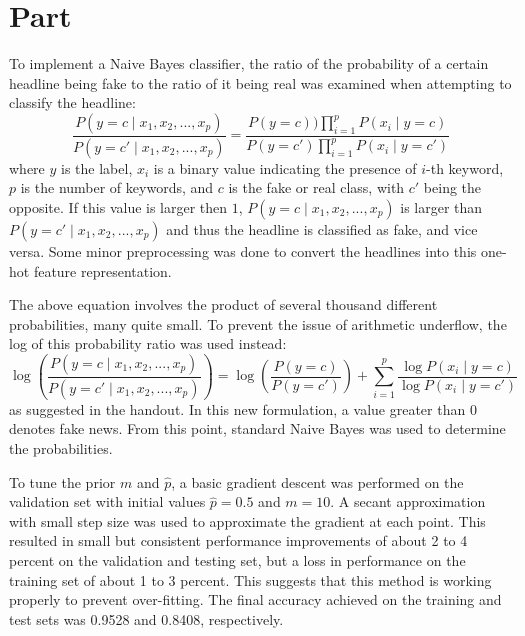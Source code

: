 \documentclass{article}
\newcommand{\enterproblemHeader}[1]{
}
\newcommand{\exitproblemHeader}[1]{
}
\newcounter{problem} %
\newcommand{\problemName}{}
\newenvironment{problem}[1][Part \theproblem]{ %
	\stepcounter{problem} %
	\renewcommand{\problemName}{#1} %
	\section{\problemName} %
	\enterproblemHeader{\problemName} %
}{
	\exitproblemHeader{\problemName} %
}
\begin{document}
\begin{problem}
	
	To implement a Naive Bayes classifier, the ratio of the probability of a certain headline being fake to the ratio of it being real was examined when attempting to classify the headline:
	\begin{equation*}
		\frac{P(y = c \mid x_1, x_2, ..., x_p)}{P(y = c' \mid x_1, x_2, ..., x_p)} = \frac{P(y = c))\prod_{i=1}^{p}P(x_i \mid y = c)}{P(y = c')\prod_{i=1}^{p}P(x_i \mid y = c')}
	\end{equation*}
	where \(y\) is the label, \(x_i\) is a binary value indicating the presence of \(i\)-th keyword, \(p\) is the number of keywords, and \(c\) is the fake or real class, with \(c'\) being the opposite. If this value is larger then \(1\), \(P(y = c \mid x_1, x_2, ..., x_p)\) is larger than \(P(y = c' \mid x_1, x_2, ..., x_p)\) and thus the headline is classified as fake, and vice versa. Some minor preprocessing was done to convert the headlines into this one-hot feature representation.
	
	The above equation involves the product of several thousand different probabilities, many quite small. To prevent the issue of arithmetic underflow, the log of this probability ratio was used instead:
	\begin{equation*}
		\log(\frac{P(y = c \mid x_1, x_2, ..., x_p)}{P(y = c' \mid x_1, x_2, ..., x_p)}) = \log(\frac{P(y = c)}{P(y = c')}) + \sum_{i=1}^{p}\frac{\log P(x_i \mid y = c)}{\log P(x_i \mid y = c')}
	\end{equation*}
	as suggested in the handout. In this new formulation, a value greater than 0 denotes fake news. From this point, standard Naive Bayes was used to determine the probabilities.
	
	To tune the prior \(m\) and \(\hat{p}\), a basic gradient descent was performed on the validation set with initial values \(\hat{p} = 0.5\) and \(m = 10\). A secant approximation with small step size was used to approximate the gradient at each point. This resulted in small but consistent performance improvements of about 2 to 4 percent on the validation and testing set, but a loss in performance on the training set of about 1 to 3 percent. This suggests that this method is working properly to prevent over-fitting. The final accuracy achieved on the training and test sets was 0.9528 and 0.8408, respectively.
	
\end{problem}
\clearpage

\end{document}
